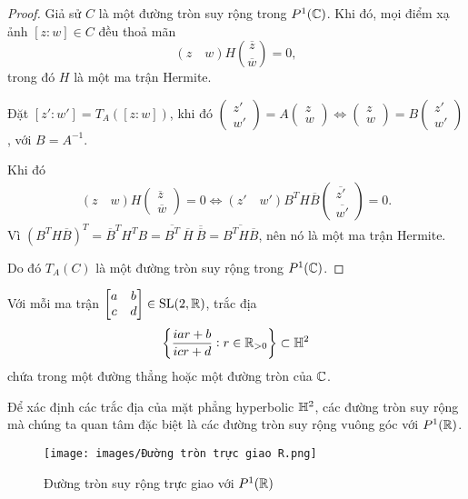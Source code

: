 \begin{proof}
    Giả sử $C$ là một đường tròn suy rộng trong $P^1(\mathbb{C})$. Khi đó, mọi điểm xạ ảnh $[z:w] \in C$ đều thoả mãn \[(z\quad w)H\binom{\overline{z}}{\overline{w}} = 0,\]
    trong đó $H$ là một ma trận Hermite.
    
    Đặt $[z':w'] = T_A([z:w])$, khi đó $\begin{pmatrix}
        z'\\w'
    \end{pmatrix} = A\begin{pmatrix}
        z\\w
    \end{pmatrix} \Leftrightarrow \begin{pmatrix}
        z\\w
    \end{pmatrix} = B\begin{pmatrix}
        z'\\w'
    \end{pmatrix}$, với $B = A^{-1}$.

    Khi đó
    \begin{align*}
        (z\quad w)H\begin{pmatrix}
            \overline{z}\\
            \overline{w}
        \end{pmatrix} = 0 \Leftrightarrow (z' \quad w')B^TH\overline{B}\begin{pmatrix}
            \overline{z'}\\
            \overline{w'}
        \end{pmatrix} = 0.
    \end{align*}
    Vì $(B^TH\overline{B})^T = \overline{B}^TH^TB = \overline{B^T}~\overline{H}~ \overline{\overline{B}}=\overline{B^TH\overline{B}}$, nên nó là một ma trận Hermite. 
    
    Do đó $T_A(C)$ là một đường tròn suy rộng trong $P^1(\mathbb{C})$.
\end{proof}
\begin{cor}\label{cor 2.2.9}
    Với mỗi ma trận $\begin{bmatrix} a & b \\ c & d \\ \end{bmatrix} \in \operatorname{SL}(2,\mathbb{R})$, trắc địa 
    \[\left\{\dfrac{iar+b}{icr+d}: r \in \mathbb{R}_{>0}\right\} \subset \mathbb{H}^2\]
    chứa trong một đường thẳng hoặc một đường tròn của $\mathbb{C}$.
\end{cor}
Để xác định các trắc địa của mặt phẳng hyperbolic $\mathbb{H}^2$, các đường tròn suy rộng mà chúng ta quan tâm đặc biệt là các đường tròn suy rộng vuông góc với $P^1(\mathbb{R})$. 
\begin{figure}
    \centering
    \texttt{[image: images/Đường tròn trực giao R.png]}
    \caption{Đường tròn suy rộng trực giao với $P^1(\mathbb{R})$}
\end{figure}

